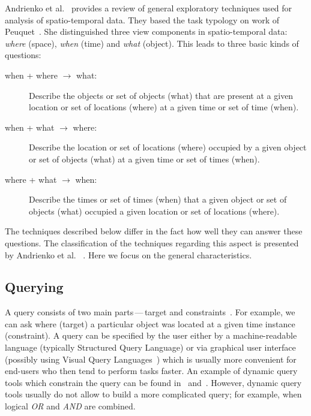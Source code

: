 \documentclass[a4paper,12pt,oneside]{book}
\newcommand{\dash}{\mbox{\,---\,}}
\begin{document}
Andrienko et al.~\cite{andrienko2003exploratory} provides a review
of general exploratory techniques used for analysis of spatio-temporal data.
They based the task typology on work
of Peuquet~\cite{peuquet1994s}.
She distinguished three view components in spatio-temporal data:
\emph{where} (space), \emph{when} (time) and \emph{what} (object).
This leads to three basic kinds of questions:
\begin{description}
    \item[when + where $\rightarrow$ what:]
        Describe the objects or set of objects (what) that are present
        at a given location or set of locations (where)
        at a given time or set of time (when).

    \item [when + what $\rightarrow$ where:]
        Describe the location or set of locations (where) occupied
        by a given object or set of objects (what) at
        a given time or set of times (when).

    \item [where + what $\rightarrow$ when:]
        Describe the times or set of times (when) that a given
        object or set of objects (what) occupied a
        given location or set of locations (where).
 \end{description}

The techniques described below differ in the fact how well they can answer these questions.
The classification of the techniques regarding this aspect is presented by Andrienko et al.%
~\cite{andrienko2003exploratory}.
Here we focus on the general characteristics.
%

\subsection{Querying}
A query consists of two main parts\dash target and constraints~\cite{andrienko2003exploratory}.
For example, we can ask where (target) a particular object was located at a given time instance (constraint).
A query can be specified by the user either by a machine-readable language (typically Structured Query Language)
or via graphical user interface (possibly using Visual Query Languages~\cite{catarci1997visual})
which is usually more convenient for end-users who then tend to perform tasks faster.
An example of dynamic query tools which constrain the query can be found
in~\cite{ahlberg1992dynamic} and~\cite{hochheiser2004dynamic}.
However, dynamic query tools usually do not allow to build a more complicated query;
for example, when logical \emph{OR} and \emph{AND} are combined.
\end{document}
